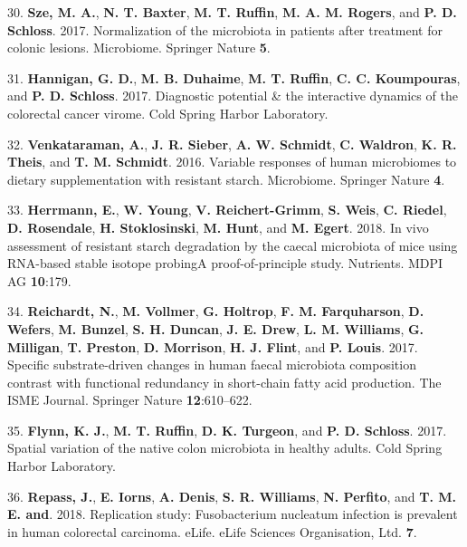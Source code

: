 \documentclass[12pt,]{article}
\begin{document}
\hypertarget{ref-Sze2017}{}
30. \textbf{Sze, M. A.}, \textbf{N. T. Baxter}, \textbf{M. T. Ruffin},
\textbf{M. A. M. Rogers}, and \textbf{P. D. Schloss}. 2017.
Normalization of the microbiota in patients after treatment for colonic
lesions. Microbiome. Springer Nature \textbf{5}.

\hypertarget{ref-Hannigan2017}{}
31. \textbf{Hannigan, G. D.}, \textbf{M. B. Duhaime}, \textbf{M. T.
Ruffin}, \textbf{C. C. Koumpouras}, and \textbf{P. D. Schloss}. 2017.
Diagnostic potential \& the interactive dynamics of the colorectal
cancer virome. Cold Spring Harbor Laboratory.

\hypertarget{ref-Venkataraman2016}{}
32. \textbf{Venkataraman, A.}, \textbf{J. R. Sieber}, \textbf{A. W.
Schmidt}, \textbf{C. Waldron}, \textbf{K. R. Theis}, and \textbf{T. M.
Schmidt}. 2016. Variable responses of human microbiomes to dietary
supplementation with resistant starch. Microbiome. Springer Nature
\textbf{4}.

\hypertarget{ref-Herrmann2018}{}
33. \textbf{Herrmann, E.}, \textbf{W. Young}, \textbf{V.
Reichert-Grimm}, \textbf{S. Weis}, \textbf{C. Riedel}, \textbf{D.
Rosendale}, \textbf{H. Stoklosinski}, \textbf{M. Hunt}, and \textbf{M.
Egert}. 2018. In vivo assessment of resistant starch degradation by the
caecal microbiota of mice using RNA-based stable isotope probingA
proof-of-principle study. Nutrients. MDPI AG \textbf{10}:179.

\hypertarget{ref-Reichardt2017}{}
34. \textbf{Reichardt, N.}, \textbf{M. Vollmer}, \textbf{G. Holtrop},
\textbf{F. M. Farquharson}, \textbf{D. Wefers}, \textbf{M. Bunzel},
\textbf{S. H. Duncan}, \textbf{J. E. Drew}, \textbf{L. M. Williams},
\textbf{G. Milligan}, \textbf{T. Preston}, \textbf{D. Morrison},
\textbf{H. J. Flint}, and \textbf{P. Louis}. 2017. Specific
substrate-driven changes in human faecal microbiota composition contrast
with functional redundancy in short-chain fatty acid production. The
ISME Journal. Springer Nature \textbf{12}:610--622.

\hypertarget{ref-Flynn_preprint_2017}{}
35. \textbf{Flynn, K. J.}, \textbf{M. T. Ruffin}, \textbf{D. K.
Turgeon}, and \textbf{P. D. Schloss}. 2017. Spatial variation of the
native colon microbiota in healthy adults. Cold Spring Harbor
Laboratory.

\hypertarget{ref-Repass2018}{}
36. \textbf{Repass, J.}, \textbf{E. Iorns}, \textbf{A. Denis},
\textbf{S. R. Williams}, \textbf{N. Perfito}, and \textbf{T. M. E. and}.
2018. Replication study: Fusobacterium nucleatum infection is prevalent
in human colorectal carcinoma. eLife. eLife Sciences Organisation, Ltd.
\textbf{7}.
\end{document}
